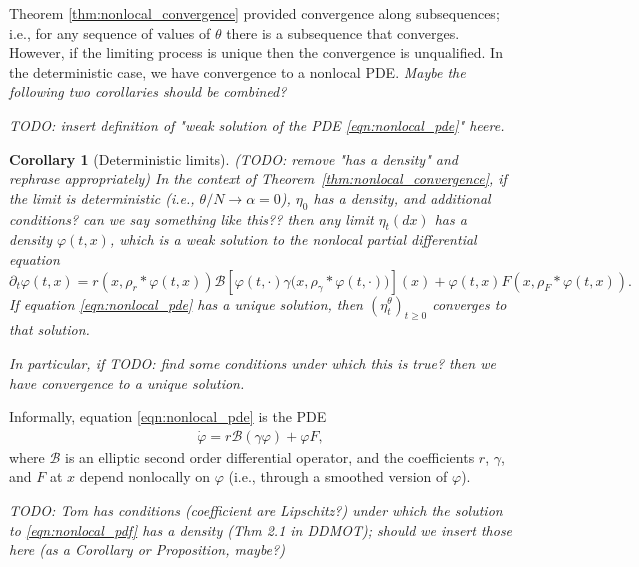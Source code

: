 \documentclass[12pt]{article}
\newtheorem{corollary}[theorem]{Corollary}
\newcommand{\DG}{\mathcal{B}}  %
\newcommand{\kernel}{\rho}  %
\newcommand{\smooth}[1]{\kernel_{#1} \! * \!}  %
\newcommand{\comment}[1]{{\color{blue} \it #1}}
\begin{document}
Theorem \ref{thm:nonlocal_convergence} provided convergence along subsequences;
i.e., for any sequence of values of $\theta$
there is a subsequence that converges.
However, if the limiting process is unique then the convergence is unqualified.
In the deterministic case, we have convergence to a nonlocal PDE.
\comment{Maybe the following two corollaries should be combined?}

\comment{
TODO: insert definition of "weak solution of the PDE \ref{eqn:nonlocal_pde}" heere.
}

\begin{corollary}[Deterministic limits]
    \label{cor:nonlocal_pde_limits}
    \comment{(TODO: remove "has a density" and rephrase appropriately)}
    In the context of Theorem~\ref{thm:nonlocal_convergence},
    if the limit is deterministic (i.e., $\theta / N \to \alpha = 0$), $\eta_0$ has a density,
    and \comment{additional conditions? can we say something like this??}
    then any limit $\eta_t(dx)$ has a density $\varphi(t, x)$,
    which is a weak solution to the nonlocal partial differential equation
    \begin{equation} \label{eqn:nonlocal_pde}
        \partial_t \varphi(t, x)
        =
        r\left(x, \smooth{r} \varphi(t,x) \right)
        \mathcal{B} \left[
            \varphi(t, \cdot)
            \gamma\big( x, \smooth{\gamma} \varphi(t, \cdot) \big)
        \right](x)
        +
        \varphi(t, x)
        F\left(x, \smooth{F} \varphi(t,x) \right)
        .
    \end{equation}
    If equation \eqref{eqn:nonlocal_pde} has a unique solution,
    then $(\eta^\theta_t)_{t \ge 0}$ converges to that solution.

    In particular, if
    \comment{TODO: find some conditions under which this is true?}
    then we have convergence to a unique solution.
\end{corollary}

Informally, equation \eqref{eqn:nonlocal_pde} is the PDE
\begin{align} \label{eqn:pde}
    \dot \varphi = r \DG\left( \gamma \varphi \right) + \varphi F ,
\end{align}
where $\DG$ is an elliptic second order differential operator,
and the coefficients $r$, $\gamma$, and $F$
at $x$ depend nonlocally on $\varphi$
(i.e., through a smoothed version of $\varphi$).

\comment{TODO: Tom has conditions (coefficient are Lipschitz?) under which
    the solution to \eqref{eqn:nonlocal_pdf} has a density (Thm 2.1 in DDMOT);
    should we insert those here (as a Corollary or Proposition, maybe?)}
\end{document}
